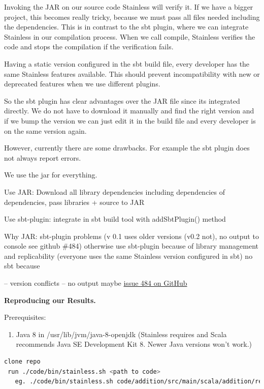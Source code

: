 \documentclass[runningheads]{llncs}
\renewcommand{\paragraph}{\textbf}%
\begin{document}
Invoking the JAR on our source code Stainless will verify it.  If we
have a bigger project, this becomes really tricky, because we must
pass all files needed including the dependencies.  This is in contrast
to the sbt plugin, where we can integrate Stainless in our compilation
process.  When we call compile, Stainless verifies the code and stops
the compilation if the verification fails.

Having a static version configured in the sbt build file, every
developer has the same Stainless features available.  This should
prevent incompatibility with new or deprecated features when we use
different plugins.

So the sbt plugin has clear advantages over the JAR file since its
integrated directly.  We do not have to download it manually and find
the right version and if we bump the version we can just edit it in
the build file and every developer is on the same version again.

However, currently there are some drawbacks.  For example the sbt
plugin does not always report errors.

We use the jar for everything. 


Use JAR:
Download all library dependencies including dependencies of dependencies, pass libraries + source to JAR
  
Use sbt-plugin: integrate in sbt build tool with addSbtPlugin() method

Why JAR:
sbt-plugin problems (v 0.1 uses older versions (v0.2 not), no output to console see github \#484)
otherwise use sbt-plugin because of library management and replicability (everyone uses the same Stainless version configured in sbt)
no sbt because

-- version conflicts
-- no output maybe \href{https://github.com/epfl-lara/stainless/issues/484}{issue 484 on
  GitHub}


\paragraph{Reproducing our Results.}

Prerequisites:
\begin{enumerate}
\item Java 8 in /usr/lib/jvm/java-8-openjdk (Stainless requires and Scala recommends Java SE Development Kit 8. Newer Java versions won't work.)
\end{enumerate}


\begin{lstlisting}[language=bash]
 clone repo
 run ./code/bin/stainless.sh <path to code>
   eg. ./code/bin/stainless.sh code/addition/src/main/scala/addition/reduced/
\end{lstlisting}
\end{document}
